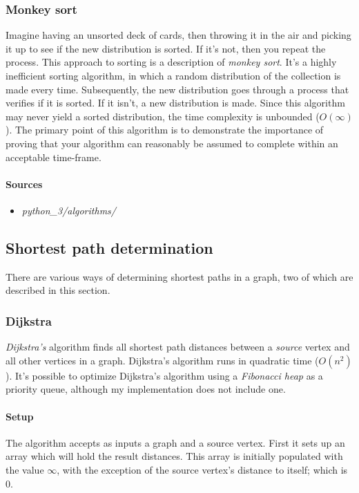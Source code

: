 \documentclass{article}
\begin{document}
{\subsubsection{Monkey sort}
Imagine having an unsorted deck of cards, then throwing it in the air and picking it up to see if the new
distribution is sorted. If it's not, then you repeat the process. This approach to sorting is a description of
{\em monkey sort}. It's a highly inefficient sorting algorithm, in which a random distribution of the collection
is made every time. Subsequently, the new distribution goes through a process that verifies if it is sorted.
If it isn't, a new distribution is made. Since this algorithm may never yield a sorted distribution, the time
complexity is unbounded (\(O(\infty)\)). The primary point of this algorithm is to demonstrate the importance of
proving that your algorithm can reasonably be assumed to complete within an acceptable time-frame.

\begin{samepage}
  \paragraph{Sources}
  \begin{itemize}
  \item{{\em python\_3/algorithms/}}
  \end{itemize}
\end{samepage}


\newpage


\subsection{Shortest path determination}
There are various ways of determining shortest paths in a graph, two of which are described in this section.

\subsubsection{Dijkstra}
{\em Dijkstra's} algorithm finds all shortest path distances between a {\em source} vertex and all other vertices
in a graph. Dijkstra's algorithm runs in quadratic time (\(O(n^2)\)). It's possible to optimize Dijkstra's algorithm
using a {\em Fibonacci heap} as a priority queue, although my implementation does not include one.

\paragraph{Setup}
The algorithm accepts as inputs a graph and a source vertex. First it sets up an array which will hold the result
distances. This array is initially populated with the value \(\infty\), with the exception of the source vertex's
distance to itself; which is 0.

}
\end{document}

